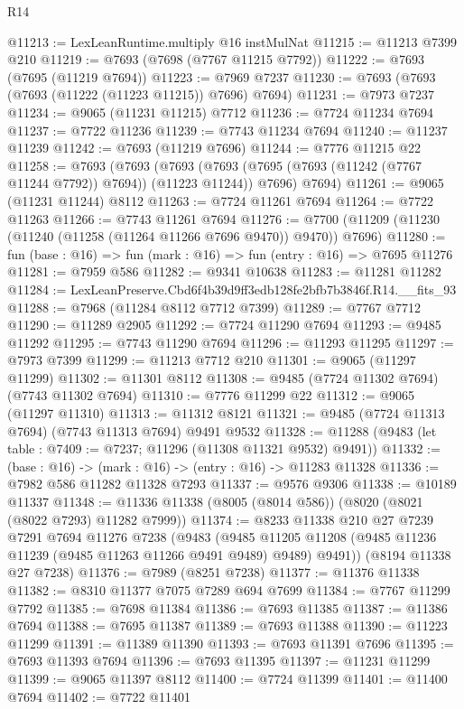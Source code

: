 \begin{lexlean}{R14}
\begin{coremodule}
@11213 := LexLeanRuntime.multiply @16 instMulNat
@11215 := @11213 @7399 @210
@11219 := @7693 (@7698 (@7767 @11215 @7792))
@11222 := @7693 (@7695 (@11219 @7694))
@11223 := @7969 @7237
@11230 := @7693 (@7693 (@7693 (@11222 (@11223 @11215)) @7696) @7694)
@11231 := @7973 @7237
@11234 := @9065 (@11231 @11215) @7712
@11236 := @7724 @11234 @7694
@11237 := @7722 @11236
@11239 := @7743 @11234 @7694
@11240 := @11237 @11239
@11242 := @7693 (@11219 @7696)
@11244 := @7776 @11215 @22
@11258 := @7693
    (@7693
      (@7693 (@7693 (@7695 (@7693 (@11242 (@7767 @11244 @7792)) @7694)) (@11223 @11244)) @7696)
      @7694)
@11261 := @9065 (@11231 @11244) @8112
@11263 := @7724 @11261 @7694
@11264 := @7722 @11263
@11266 := @7743 @11261 @7694
@11276 := @7700 (@11209 (@11230 (@11240 (@11258 (@11264 @11266 @7696 @9470)) @9470)) @7696)
@11280 := fun (base : @16) => fun (mark : @16) => fun (entry : @16) => @7695 @11276
@11281 := @7959 @586
@11282 := @9341 @10638
@11283 := @11281 @11282
@11284 := LexLeanPreserve.Cbd6f4b39d9ff3edb128fe2bfb7b3846f.R14.__fits_93
@11288 := @7968 (@11284 @8112 @7712 @7399)
@11289 := @7767 @7712
@11290 := @11289 @2905
@11292 := @7724 @11290 @7694
@11293 := @9485 @11292
@11295 := @7743 @11290 @7694
@11296 := @11293 @11295
@11297 := @7973 @7399
@11299 := @11213 @7712 @210
@11301 := @9065 (@11297 @11299)
@11302 := @11301 @8112
@11308 := @9485 (@7724 @11302 @7694) (@7743 @11302 @7694)
@11310 := @7776 @11299 @22
@11312 := @9065 (@11297 @11310)
@11313 := @11312 @8121
@11321 := @9485 (@7724 @11313 @7694) (@7743 @11313 @7694) @9491 @9532
@11328 := @11288 (@9483 (let table : @7409 := @7237; @11296 (@11308 @11321 @9532) @9491))
@11332 := (base : @16) -> (mark : @16) -> (entry : @16) -> @11283 @11328
@11336 := @7982 @586 @11282 @11328 @7293
@11337 := @9576 @9306
@11338 := @10189 @11337
@11348 := @11336 @11338 (@8005 (@8014 @586)) (@8020 (@8021 (@8022 @7293) @11282 @7999))
@11374 := @8233
    @11338
    @210
    @27
    @7239
    @7291
    @7694
    @11276
    @7238
    (@9483
      (@9485 @11205 @11208 (@9485 @11236 @11239 (@9485 @11263 @11266 @9491 @9489) @9489) @9491))
    (@8194 @11338 @27 @7238)
@11376 := @7989 (@8251 @7238)
@11377 := @11376 @11338
@11382 := @8310 @11377 @7075 @7289 @694 @7699
@11384 := @7767 @11299 @7792
@11385 := @7698 @11384
@11386 := @7693 @11385
@11387 := @11386 @7694
@11388 := @7695 @11387
@11389 := @7693 @11388
@11390 := @11223 @11299
@11391 := @11389 @11390
@11393 := @7693 @11391 @7696
@11395 := @7693 @11393 @7694
@11396 := @7693 @11395
@11397 := @11231 @11299
@11399 := @9065 @11397 @8112
@11400 := @7724 @11399
@11401 := @11400 @7694
@11402 := @7722 @11401

\end{coremodule}
\end{lexlean}
